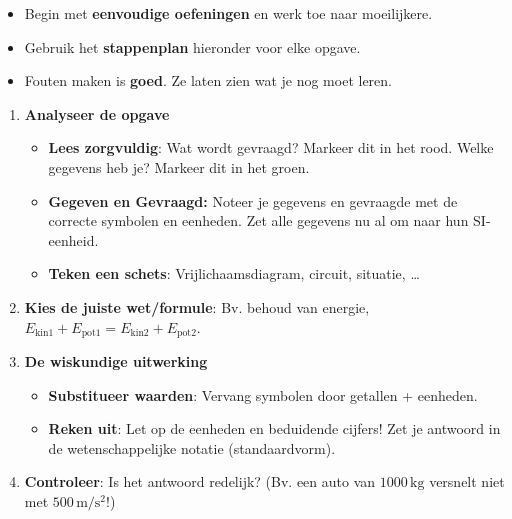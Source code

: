 \documentclass{ximera}
\begin{document}
\begin{itemize}
    \item Begin met \textbf{eenvoudige oefeningen} en werk toe naar moeilijkere.
    \item Gebruik het \textbf{stappenplan} hieronder voor elke opgave.
    \item Fouten maken is \textbf{goed}. Ze laten zien wat je nog moet leren.
\end{itemize}

\begin{algorithm}[foldable=true,title={Stappenplan voor fysica-problemen}]\nl
\begin{enumerate}%
    \item \textbf{Analyseer de opgave} \begin{itemize}
      \item \textbf{Lees zorgvuldig}: Wat wordt gevraagd? Markeer dit in het rood. Welke gegevens heb je? Markeer dit in het groen.
      \item \textbf{Gegeven en Gevraagd:} Noteer je gegevens en gevraagde met de correcte symbolen en eenheden. Zet alle gegevens nu al om naar hun SI-eenheid.
      \item \textbf{Teken een schets}: Vrijlichaamsdiagram, circuit, situatie, \dots
    \end{itemize}
    \item \textbf{Kies de juiste wet/formule}: Bv. behoud van energie, \(E_\text{kin1} + E_\text{pot1} = E_\text{kin2} + E_\text{pot2}\).
    \item \textbf{De wiskundige uitwerking} \begin{itemize}
      \item \textbf{Substitueer waarden}: Vervang symbolen door getallen + eenheden.
      \item \textbf{Reken uit}: Let op de eenheden en beduidende cijfers! Zet je antwoord in de wetenschappelijke notatie (standaardvorm).
  \end{itemize}
      \item \textbf{Controleer}: Is het antwoord redelijk? (Bv. een auto van $1000 \mathrm{\, kg}$ versnelt niet met $500 \mathrm{\, m/s^2}$!)
\end{enumerate}
\end{algorithm}
\end{document}
